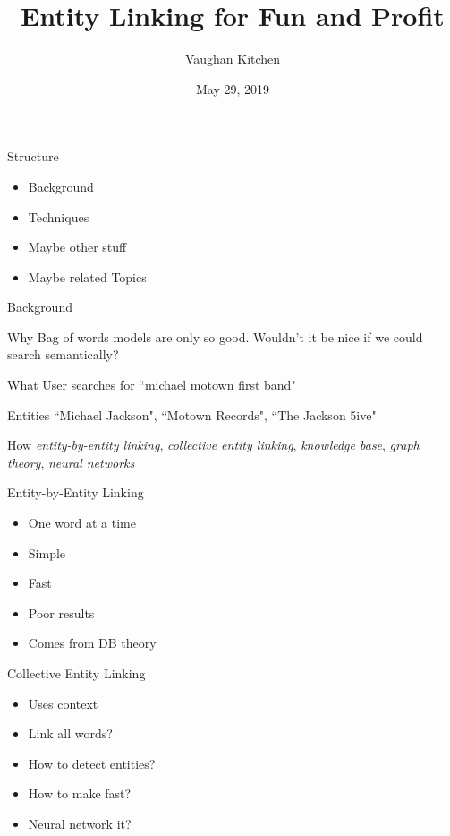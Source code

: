 \documentclass{beamer}
\title{Entity Linking for Fun and Profit}
\author{Vaughan Kitchen}
\date{May 29, 2019}
\begin{document}
\begin{frame}
\titlepage
\end{frame}

\begin{frame}{Structure}
	\begin{itemize}
		\item Background
		\item Techniques
		\item Maybe other stuff
		\item Maybe related Topics
	\end{itemize}
\end{frame}

\begin{frame}{Background}
	\begin{block}{Why}
		Bag of words models are only so good. Wouldn't it be nice if we could search semantically?
	\end{block}
	\begin{block}{What}
		User searches for ``michael motown first band"

		Entities ``Michael Jackson", ``Motown Records", ``The Jackson 5ive"
	\end{block}
	\begin{block}{How}
		\textit{entity-by-entity linking}, \textit{collective entity linking}, \textit{knowledge base}, \textit{graph theory}, \textit{neural networks}
	\end{block}
\end{frame}

\begin{frame}{Entity-by-Entity Linking}
	\begin{itemize}
		\item One word at a time
		\item Simple
		\item Fast
		\item Poor results
		\item Comes from DB theory
	\end{itemize}
\end{frame}

\begin{frame}{Collective Entity Linking}
	\begin{itemize}
		\item Uses context
		\item Link all words?
		\item How to detect entities?
		\item How to make fast?
		\item Neural network it?
	\end{itemize}
\end{frame}
\end{document}
